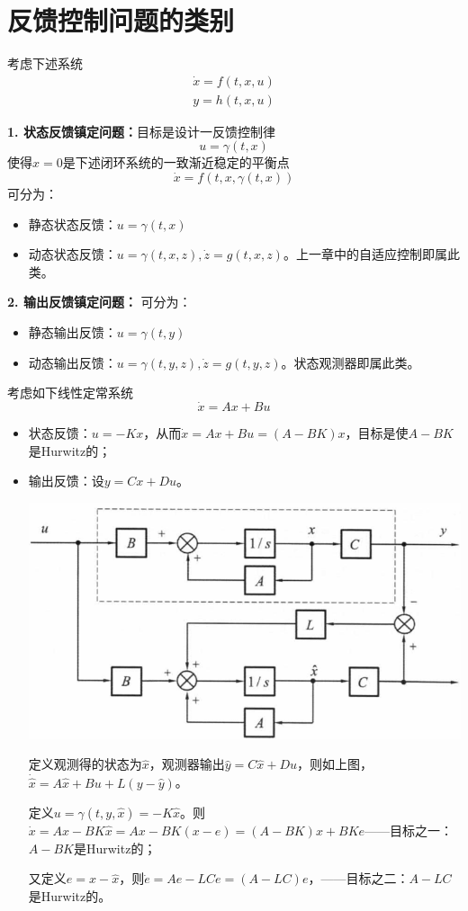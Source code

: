 \section{反馈控制问题的类别}\label{5Aref}
考虑下述系统
\begin{equation}
    \begin{aligned}
  \dot{x} = f (t, x, u)\\
  y = h (t, x, u)
\end{aligned}\label{sys:1}
\end{equation}

\textbf{1. 状态反馈镇定问题：}目标是设计一反馈控制律
\[ u = \gamma (t, x) \]
使得$x = 0$是下述闭环系统的一致渐近稳定的平衡点
\[ \dot{x} = f (t, x, \gamma (t, x)) \]
可分为：
\begin{itemize}[leftmargin=1em]
    \item 静态状态反馈：$u = \gamma (t, x)$
    \item 动态状态反馈：$u = \gamma (t, x, z), \dot{z} = g (t, x, z)$。上一章中的自适应控制即属此类。
\end{itemize}

\textbf{2. 输出反馈镇定问题：}
可分为：
\begin{itemize}[leftmargin=1em]
\item 静态输出反馈：$u = \gamma (t, y)$
\item 动态输出反馈：$u = \gamma (t, y, z), \dot{z} = g (t, y, z)$。状态观测器即属此类。
\end{itemize}

\begin{example}
  考虑如下线性定常系统
  \[ \dot{x} = A x + B u \]
 \begin{itemize}[leftmargin=1em]
  \item 状态反馈：$u = - K x$，从而$\dot{x} = A x + B u = (A - B K) x$，目标是使$A - B K$是Hurwitz的；
  
  \item 输出反馈：设$y=Cx+Du$。

  \begin{center}
      \includegraphics[width=0.5\linewidth]{figure/adaptive/state_observer.png}
      \label{fig:state-observer}
  \end{center}
  
  定义观测得的状态为$\hat{x}$，观测器输出$\hat{y} = C  \hat{x} + D  u$，则如上图，
  $\dot{\hat{x}} = A  \hat{x} + B  u + L(y - \hat{y})$。

  定义$u =\gamma(t,y,\hat{x})= - K \hat{x}$。则$\dot{x} = A x - B K \hat{x}=Ax-BK(x-e)=(A-BK)x+BKe$——目标之一：$A-BK$是Hurwitz的；
  
  又定义$e = x - \hat{x}$，则$\dot{e} = A e - L C e = (A - L C) e$，——目标之二：$A - L C$是Hurwitz的。  
  \end{itemize}
\end{example}

